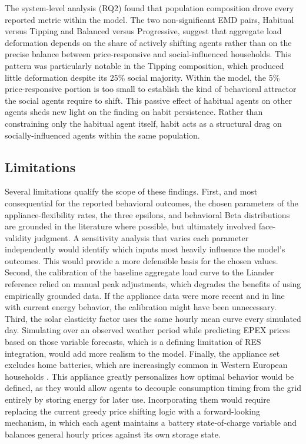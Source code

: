\documentclass[11pt, a4paper]{article}
\begin{document}
The system-level analysis (RQ2) found that population composition drove every reported metric within the model. The two non-significant EMD pairs, Habitual versus Tipping and Balanced versus Progressive, suggest that aggregate load deformation depends on the share of actively shifting agents rather than on the precise balance between price-responsive and social-influenced households. This pattern was particularly notable in the Tipping composition, which produced little deformation despite its 25\% social majority. Within the model, the 5\% price-responsive portion is too small to establish the kind of behavioral attractor the social agents require to shift. This passive effect of habitual agents on other agents sheds new light on the \textcite{haseler_promoting_2024} finding on habit persistence. Rather than constraining only the habitual agent itself, habit acts as a structural drag on socially-influenced agents within the same population.
 
\subsection{Limitations}\label{subs:limitations}
 
Several limitations qualify the scope of these findings. First, and most consequential for the reported behavioral outcomes, the chosen parameters of the appliance-flexibility rates, the three epsilons, and behavioral Beta distributions are grounded in the literature where possible, but ultimately involved face-validity judgment. A sensitivity analysis that varies each parameter independently would identify which inputs most heavily influence the model's outcomes. This would provide a more defensible basis for the chosen values. Second, the calibration of the baseline aggregate load curve to the Liander reference relied on manual peak adjustments, which degrades the benefits of using empirically grounded data. If the appliance data were more recent and in line with current energy behavior, the calibration might have been unnecessary. Third, the solar elasticity factor uses the same hourly mean curve every simulated day. Simulating over an observed weather period while predicting EPEX prices based on those variable forecasts, which is a defining limitation of RES integration, would add more realism to the model. Finally, the appliance set excludes home batteries, which are increasingly common in Western European households \autocite{dam_techno-economic_2024}. This appliance greatly personalizes how optimal behavior would be defined, as they would allow agents to decouple consumption timing from the grid entirely by storing energy for later use. Incorporating them would require replacing the current greedy price shifting logic with a forward-looking mechanism, in which each agent maintains a battery state-of-charge variable and balances general hourly prices against its own storage state.
 
\end{document}
